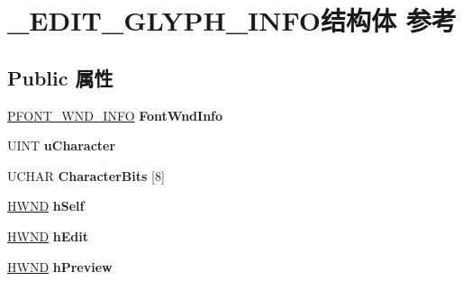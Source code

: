 \hypertarget{struct___e_d_i_t___g_l_y_p_h___i_n_f_o}{}\section{\+\_\+\+E\+D\+I\+T\+\_\+\+G\+L\+Y\+P\+H\+\_\+\+I\+N\+F\+O结构体 参考}
\label{struct___e_d_i_t___g_l_y_p_h___i_n_f_o}
\subsection*{Public 属性}
\begin{DoxyCompactItemize}
\item 
\mbox{\label{struct___e_d_i_t___g_l_y_p_h___i_n_f_o_a0a8e7ab29c57960e4368df7a43ab787d}} 
\hyperlink{struct___f_o_n_t___w_n_d___i_n_f_o}{P\+F\+O\+N\+T\+\_\+\+W\+N\+D\+\_\+\+I\+N\+FO} {\bfseries Font\+Wnd\+Info}
\item 
\mbox{\label{struct___e_d_i_t___g_l_y_p_h___i_n_f_o_a519f6c214b3d45ee66c4ec2bed4d7ec8}} 
U\+I\+NT {\bfseries u\+Character}
\item 
\mbox{\label{struct___e_d_i_t___g_l_y_p_h___i_n_f_o_ae7c6582e7bc1fb84567758fac99e4435}} 
U\+C\+H\+AR {\bfseries Character\+Bits} \mbox{[}8\mbox{]}
\item 
\mbox{\label{struct___e_d_i_t___g_l_y_p_h___i_n_f_o_a06511c51f77b145150314474bb005a0a}} 
\hyperlink{interfacevoid}{H\+W\+ND} {\bfseries h\+Self}
\item 
\mbox{\label{struct___e_d_i_t___g_l_y_p_h___i_n_f_o_a2bf9add1898b95a3a2f824f7ffaf13ac}} 
\hyperlink{interfacevoid}{H\+W\+ND} {\bfseries h\+Edit}
\item 
\mbox{\label{struct___e_d_i_t___g_l_y_p_h___i_n_f_o_aa34267d4aed5f283b81dd0429cba5876}} 
\hyperlink{interfacevoid}{H\+W\+ND} {\bfseries h\+Preview}
\item 
\mbox{\label{struct___e_d_i_t___g_l_y_p_h___i_n_f_o_abaa20fe7e17971177ff30a6b4b9df0e1}} 

\end{DoxyCompactItemize}

